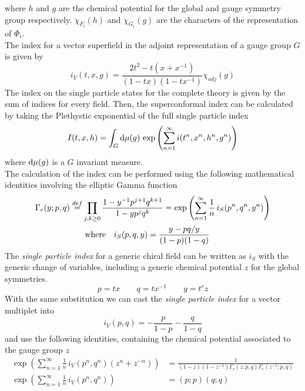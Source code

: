 where $h$ and $g$ are the chemical potential for the global and gauge symmetry group respectively. $\chi_{F_i}(h)$ and $\chi_{G_i}(g)$ are the characters of the representation of $\Phi_i$.\\
The index for a vector superfield in the adjoint representation of a gauge group $G$ is given by \cite{Dolan:2008qi}
\begin{equation}
i_{V} (t,x,g) = \frac{2 t^2 - t(x + x^{-1})}{(1-tx) (1 - tx^{-1})} \chi_{adj}(g)
\end{equation}
The index on the single particle states for the complete theory is given by the sum of indices for every field. 
Then, the superconformal index can be calculated by taking the Plethystic exponential \cite{Feng:2007ur} of the full single particle index
\begin{equation}
  I(t,x,h) = \int_{G} \hbox{d} \mu(g)\,  \exp{ \left(  \sum_{n=1}^{\infty}i(t^n,x^n,h^n,g^n) \right)}
  \end{equation}  
where $\hbox{d} \mu(g)$ is a $G$ invariant measure.\\
The calculation of the index can be performed using the following mathematical identities involving the elliptic Gamma function
\begin{align}
\Gamma_e ( y; p, q) \overset{def}{=} & \prod_{j,k \geq 0} \frac{1 - y^{-1}p^{j+1}q^{k+1}}{1 - y p^j q^k} = \exp \left(  
\sum_{n=1}^{\infty} \frac{1}{n} \, i_S(p^n,q^n,y^n)
\right)\\
& \; \hbox{where} \quad i_S(p,q,y) = \frac{y - pq/y}{(1-p)(1-q)}
\end{align}
The \emph{single particle index} for a generic chiral field can be written as $i_S$ with the generic change of variables, including a generic chemical potential $z$ for the global symmetries. 
\begin{equation}
p = tx \qquad q = t x^{-1} \qquad y = t^r z
\end{equation}
With the same substitution we can cast the \emph{single particle index} for a vector multiplet into
\begin{equation}
i_V(p,q) = - \frac{p}{1-p} - \frac{q}{1-q}
\end{equation}
and use the following identities, containing the chemical potential associated to the gauge group $z$
\begin{align}
\exp \left(  
\sum_{n=1}^{\infty} \frac{1}{n}\, i_V(p^n,q^n) ( z^n + z^{-n}) \right) & = \frac{1}{(1-z)(1-z^{-1}) \Gamma_e(z;p,q) \Gamma_e(z^{-1};p,q)}
\\
\exp \left(
\sum_{n=1}^{\infty} \frac{1}{n} \, i_V(p^n,q^n) \right) & = (p;p) (q;q)
\end{align}
